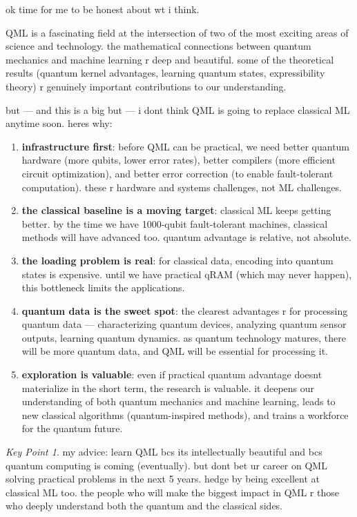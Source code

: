 \documentclass[11pt,a4paper]{article}
\theoremstyle{definition}
\theoremstyle{remark}
\newtheorem*{keypoint}{Key Point}
\begin{document}
ok time for me to be honest about wt i think.

QML is a fascinating field at the intersection of two of the most exciting areas of science and technology. the mathematical connections between quantum mechanics and machine learning r deep and beautiful. some of the theoretical results (quantum kernel advantages, learning quantum states, expressibility theory) r genuinely important contributions to our understanding.

but --- and this is a big but --- i dont think QML is going to replace classical ML anytime soon. heres why:

\begin{enumerate}[label=\arabic*.]
    \item \textbf{infrastructure first}: before QML can be practical, we need better quantum hardware (more qubits, lower error rates), better compilers (more efficient circuit optimization), and better error correction (to enable fault-tolerant computation). these r hardware and systems challenges, not ML challenges.

    \item \textbf{the classical baseline is a moving target}: classical ML keeps getting better. by the time we have 1000-qubit fault-tolerant machines, classical methods will have advanced too. quantum advantage is relative, not absolute.

    \item \textbf{the loading problem is real}: for classical data, encoding into quantum states is expensive. until we have practical qRAM (which may never happen), this bottleneck limits the applications.

    \item \textbf{quantum data is the sweet spot}: the clearest advantages r for processing quantum data --- characterizing quantum devices, analyzing quantum sensor outputs, learning quantum dynamics. as quantum technology matures, there will be more quantum data, and QML will be essential for processing it.

    \item \textbf{exploration is valuable}: even if practical quantum advantage doesnt materialize in the short term, the research is valuable. it deepens our understanding of both quantum mechanics and machine learning, leads to new classical algorithms (quantum-inspired methods), and trains a workforce for the quantum future.
\end{enumerate}

\begin{keypoint}
my advice: learn QML bcs its intellectually beautiful and bcs quantum computing is coming (eventually). but dont bet ur career on QML solving practical problems in the next 5 years. hedge by being excellent at classical ML too. the people who will make the biggest impact in QML r those who deeply understand both the quantum and the classical sides.
\end{keypoint}
\end{document}
